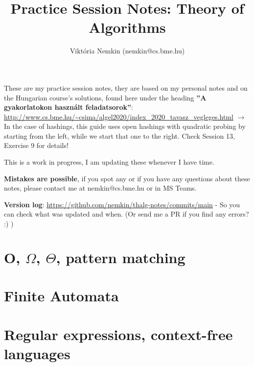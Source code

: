 \documentclass[a4paper]{article}
\author{Viktória Nemkin (nemkin@cs.bme.hu)}
\title{Practice Session Notes: Theory of Algorithms}
\newcommand{\titlemath}[1]{\texorpdfstring{#1}{Lg}}
\begin{document}
\maketitle

These are my practice session notes, they are based on my personal notes and on the Hungarian course's solutions, found here under the heading \textbf{''A gyakorlatokon használt feladatsorok''}:\\ \url{http://www.cs.bme.hu/~csima/algel2020/index_2020_tavasz_vegleges.html} $\rightarrow$ In the case of hashings, this guide uses open hashings with quadratic probing by starting from the left, while we start that one to the right. Check Session 13, Exercise 9 for details!

This is a work in progress, I am updating these whenever I have time.

\textbf{Mistakes are possible}, if you spot any or if you have any questions about these notes, please contact me at nemkin@cs.bme.hu or in MS Teams.

\textbf{Version log}: \href{https://github.com/nemkin/thalg-notes/commits/main}{https://github.com/nemkin/thalg-notes/commits/main} - So you can check what was updated and when. (Or send me a PR if you find any errors? :) )

\tableofcontents
\pagebreak

\section{O, \titlemath{$\Omega$, $\Theta$}, pattern matching}
\pagebreak
\pagebreak
\pagebreak
\pagebreak
\pagebreak
\pagebreak
\pagebreak
\pagebreak
\pagebreak
\pagebreak
\pagebreak
\pagebreak

\section{Finite Automata}
\pagebreak
\pagebreak
\pagebreak
\pagebreak
\pagebreak
\pagebreak
\pagebreak
\pagebreak
\pagebreak
\pagebreak
\pagebreak
\pagebreak
\pagebreak

\section{Regular expressions, context-free languages}
\pagebreak
\pagebreak
\pagebreak
\pagebreak
\pagebreak
\pagebreak
\pagebreak
\pagebreak
\pagebreak
\pagebreak
\pagebreak
\pagebreak
\end{document}
